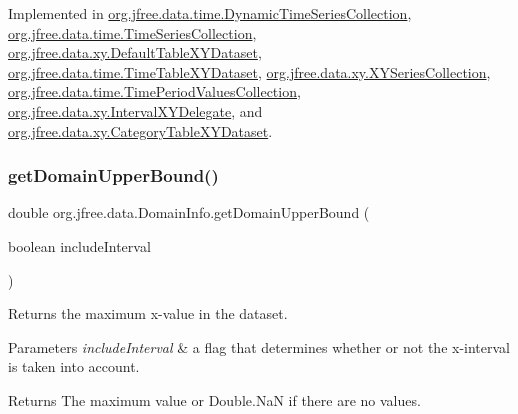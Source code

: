 Implemented in \mbox{\hyperlink{classorg_1_1jfree_1_1data_1_1time_1_1_dynamic_time_series_collection_afdb5cebf56ab6b2bfebf8cec7d734782}{org.\+jfree.\+data.\+time.\+Dynamic\+Time\+Series\+Collection}}, \mbox{\hyperlink{classorg_1_1jfree_1_1data_1_1time_1_1_time_series_collection_a83943a7efe069eddacb00364bbcef030}{org.\+jfree.\+data.\+time.\+Time\+Series\+Collection}}, \mbox{\hyperlink{classorg_1_1jfree_1_1data_1_1xy_1_1_default_table_x_y_dataset_abe4d9b10bcde19826e79619c267b1815}{org.\+jfree.\+data.\+xy.\+Default\+Table\+X\+Y\+Dataset}}, \mbox{\hyperlink{classorg_1_1jfree_1_1data_1_1time_1_1_time_table_x_y_dataset_a81f1ebe8487533e070d335efa8974bf8}{org.\+jfree.\+data.\+time.\+Time\+Table\+X\+Y\+Dataset}}, \mbox{\hyperlink{classorg_1_1jfree_1_1data_1_1xy_1_1_x_y_series_collection_a4830b1dd51af2617e8a5bf80fdcf9aee}{org.\+jfree.\+data.\+xy.\+X\+Y\+Series\+Collection}}, \mbox{\hyperlink{classorg_1_1jfree_1_1data_1_1time_1_1_time_period_values_collection_adfb18911920ee6e9f74eae3357741461}{org.\+jfree.\+data.\+time.\+Time\+Period\+Values\+Collection}}, \mbox{\hyperlink{classorg_1_1jfree_1_1data_1_1xy_1_1_interval_x_y_delegate_a7ecacbb41b13efa1708571b8ada59998}{org.\+jfree.\+data.\+xy.\+Interval\+X\+Y\+Delegate}}, and \mbox{\hyperlink{classorg_1_1jfree_1_1data_1_1xy_1_1_category_table_x_y_dataset_aef047ab681bbb08115dc9769f5bcb52a}{org.\+jfree.\+data.\+xy.\+Category\+Table\+X\+Y\+Dataset}}.

\mbox{\label{interfaceorg_1_1jfree_1_1data_1_1_domain_info_a00e455f8db5bd8515266000cacc74e89}} 
\subsubsection{\texorpdfstring{get\+Domain\+Upper\+Bound()}{getDomainUpperBound()}}
{\footnotesize\ttfamily double org.\+jfree.\+data.\+Domain\+Info.\+get\+Domain\+Upper\+Bound (\begin{DoxyParamCaption}\item[{boolean}]{include\+Interval }\end{DoxyParamCaption})}

Returns the maximum x-\/value in the dataset.


\begin{DoxyParams}{Parameters}
{\em include\+Interval} & a flag that determines whether or not the x-\/interval is taken into account.\\
\hline
\end{DoxyParams}
\begin{DoxyReturn}{Returns}
The maximum value or {\ttfamily Double.\+NaN} if there are no values. 
\end{DoxyReturn}


